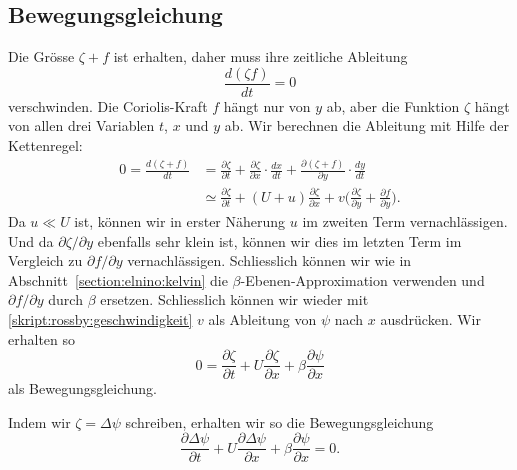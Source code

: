 \subsection{Bewegungsgleichung\label{subsection:rossby:bewegungsgleichung}}
Die Grösse $\zeta+f$ ist erhalten, daher muss ihre zeitliche Ableitung
\[
\frac{d(\zeta f)}{dt}=0
\]
verschwinden.
Die Coriolis-Kraft
$f$ hängt nur von $y$ ab, aber die Funktion $\zeta$ hängt von allen
drei Variablen $t$, $x$ und $y$ ab.
Wir berechnen die Ableitung mit Hilfe der Kettenregel:
\begin{align*}
0
=
\frac{d(\zeta+f)}{dt}
&=
\frac{\partial\zeta}{\partial t}
+
\frac{\partial\zeta}{\partial x}\cdot \frac{dx}{dt}
+
\frac{\partial(\zeta+f)}{\partial y}\cdot\frac{dy}{dt}
\\
&\simeq
\frac{\partial\zeta}{\partial t}
+
(U+u)\frac{\partial\zeta}{\partial x}
+
v\biggl(\frac{\partial\zeta}{\partial y} + \frac{\partial f}{\partial y}\biggr).
\end{align*}
Da $u\ll U$ ist, können wir in erster Näherung $u$ im zweiten Term 
vernachlässigen.
Und da $\partial\zeta/\partial y$ ebenfalls sehr klein ist, können
wir dies im letzten Term im Vergleich zu $\partial f/\partial y$
vernachlässigen.
Schliesslich können wir wie in Abschnitt~\ref{section:elnino:kelvin}
die $\beta$-Ebenen-Approximation verwenden und $\partial f/\partial y$
durch $\beta$ ersetzen.
Schliesslich können wir wieder mit \eqref{skript:rossby:geschwindigkeit}
$v$ als Ableitung von $\psi$ nach $x$ ausdrücken.
Wir erhalten so
\[
0
=
\frac{\partial\zeta}{\partial t}
+
U\frac{\partial\zeta}{\partial x}
+
\beta\frac{\partial\psi}{\partial x}
\]
als Bewegungsgleichung.

Indem wir $\zeta=\Delta \psi$ schreiben, erhalten wir so die 
Bewegungsgleichung
\begin{equation}
\frac{\partial\Delta\psi}{\partial t}
+
U\frac{\partial\Delta\psi}{\partial x}
+
\beta\frac{\partial\psi}{\partial x}
=
0.
\label{rossby:gleichung}
\end{equation}


